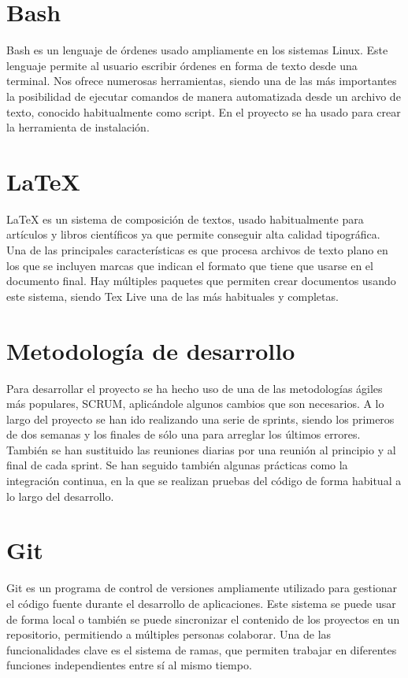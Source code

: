 \section{Bash}
Bash es un lenguaje de órdenes usado ampliamente en los sistemas Linux. Este lenguaje permite al usuario escribir órdenes en forma de texto desde una terminal. Nos ofrece numerosas herramientas, siendo una de las más importantes la posibilidad de ejecutar comandos de manera automatizada desde un archivo de texto, conocido habitualmente como script. En el proyecto se ha usado para crear la herramienta de instalación.

\section{LaTeX}
LaTeX es un sistema de composición de textos, usado habitualmente para artículos y libros científicos ya que permite conseguir alta calidad tipográfica. Una de las principales características es que procesa archivos de texto plano en los que se incluyen marcas que indican el formato que tiene que usarse en el documento final.
Hay múltiples paquetes que permiten crear documentos usando este sistema, siendo Tex Live una de las más habituales y completas.

\section{Metodología de desarrollo}
Para desarrollar el proyecto se ha hecho uso de una de las metodologías ágiles más populares, SCRUM, aplicándole algunos cambios que son necesarios. A lo largo del proyecto se han ido realizando una serie de sprints, siendo los primeros de dos semanas y los finales de sólo una para arreglar los últimos errores. También se han sustituido las reuniones diarias por una reunión al principio y al final de cada sprint. Se han seguido también algunas prácticas como la integración continua, en la que se realizan pruebas del código de forma habitual a lo largo del desarrollo.

\section{Git}
Git es un programa de control de versiones ampliamente utilizado para gestionar el código fuente durante el desarrollo de aplicaciones. Este sistema se puede usar de forma local o también se puede sincronizar el contenido de los proyectos en un repositorio, permitiendo a múltiples personas colaborar. Una de las funcionalidades clave es el sistema de ramas, que permiten trabajar en diferentes funciones independientes entre sí al mismo tiempo.
